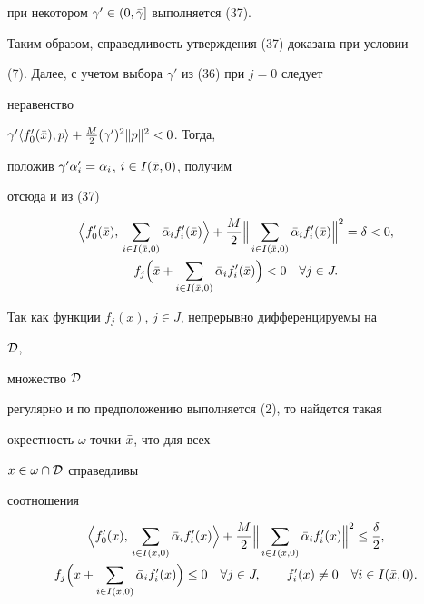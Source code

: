 \begin{pf}
при некотором $\gamma'\in(0,\Bar\gamma]$ выполняется (37).


Таким образом, справедливость утверждения (37) доказана при условии


(7). Далее, с учетом выбора $\gamma'$ из (36) при $j=0$ следует


неравенство


$\gamma'\langle f'_0(\Bar x),p\rangle+\frac{M}{2}(\gamma')^2\|p\|^2<0$. Тогда,


положив $\gamma'\alpha'_i=\Bar\alpha_i$, $i\in I(\Bar x,0)$, получим


отсюда и из (37)


\begin{gather*}


\Bigl\la f'_0(\Bar x),\,\sum_{i\in I(\Bar x,0)}\Bar\alpha_i


f'_i(\Bar x)\Bigr\ra+\frac{M}{2}\Bigl\|\,\sum_{i\in I(\Bar x,0)}


\Bar\alpha_if'_i(\Bar x)\Bigr\|^2=\delta<0,\\


f_j\Bigl(\Bar x+\sum_{i\in I(\Bar x,0)}\Bar\alpha_if'_i(\Bar x)\Bigr)


<0\quad\forall j\in J.


\end{gather*}


Так как функции $f_j(x)$, $j\in J$, непрерывно дифференцируемы на


$\cal D$,


множество $\cal D$


регулярно и по предположению выполняется (2), то найдется такая


окрестность $\omega$ точки $\Bar x$, что для всех


$x\in\omega\cap\cal D$ справедливы


соотношения


\begin{gather*}


\Bigl\la f'_0(x),\,\sum_{i\in I(\Bar x,0)}\Bar\alpha_if'_i(x)


\Bigr\ra+\frac{M}{2}\Bigl\|\,\sum_{i\in I(\Bar x,0)}


\Bar\alpha_if'_i(x)\Bigr\|^2\le \frac{\delta}{2},\\


f_j\Bigl(x+\sum_{i\in I(\Bar x,0)}\Bar\alpha_if'_i(x)\Bigr)\le 0


\quad \forall j\in J,\qquad f'_i(x)\ne 0\quad \forall i\in


I(\Bar x,0).



\end{gather*}
\end{pf}
